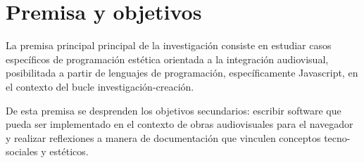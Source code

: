 \section*{Premisa y objetivos}


La premisa principal principal de la investigación consiste en estudiar casos específicos de programación estética orientada a la integración audiovisual, posibilitada a partir de lenguajes de programación, específicamente Javascript, en el contexto del bucle investigación-creación. 

De esta premisa se desprenden los objetivos secundarios: escribir software que pueda ser implementado en el contexto de obras audiovisuales para el navegador y realizar reflexiones a manera de documentación que vinculen conceptos tecno-sociales y estéticos. 

